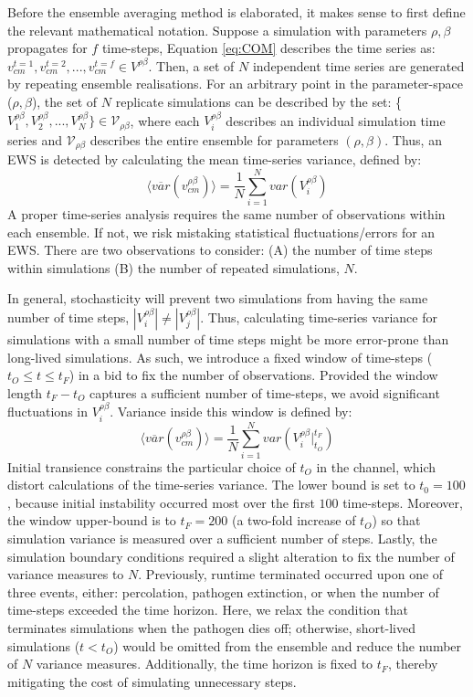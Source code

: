 Before the ensemble averaging method is elaborated, it makes sense to first define the relevant mathematical notation.
Suppose a simulation with parameters $\rho, \beta$ propagates for $f$ time-steps, Equation \ref{eq:COM} describes the time series as: $v_{cm}^{t=1}, v_{cm}^{t=2},..., v_{cm}^{t=f} \in V^{\rho\beta}$. 
Then, a set of $N$ independent time series are generated by repeating  ensemble realisations. 
For an arbitrary point in the parameter-space ($\rho, \beta$),
the set of $N$ replicate simulations can be described by the set: \{$V_1^{\rho\beta}, V_2^{\rho \beta},..., V_N^{\rho\beta}\} \in \mathcal{V}_{\rho\beta}$, 
where each $V_i^{\rho\beta}$ describes an individual simulation time series and $\mathcal{V}_{\rho\beta}$ describes the entire ensemble for parameters $(\rho, \beta)$. 
Thus, an EWS is detected by calculating the mean time-series variance,
defined by:
\begin{equation}
\label{eq:ews_eq}
    \big\langle \overline{var}(v^{\rho\beta}_{cm}) \big\rangle = \frac{1}{N}\sum\limits_{i=1}^{N} var(V_i^{\rho\beta})
\end{equation}
A proper time-series analysis requires the same number of observations within each ensemble.
If not, we risk mistaking statistical fluctuations/errors for an EWS.
There are two observations to consider: 
(A) the number of time steps within simulations 
(B) the number of repeated simulations, $N$.

In general, stochasticity will prevent two simulations from having the same number of time steps, 
$|V_i^{\rho\beta}| \neq |V_j^{\rho\beta}|$.
Thus, calculating time-series variance for simulations with a small number of time steps might be more error-prone than long-lived simulations.
As such, we introduce a fixed window of time-steps ($t_O\leq t \leq t_F$) in a bid to fix the number of observations.
Provided the window length $t_F-t_O$ captures a sufficient number of time-steps, we avoid significant fluctuations in $V_i^{\rho\beta}$. 
Variance inside this window is defined by:
\begin{equation}
\label{eq:ews_eq1}
    \big\langle \overline{var}(v^{\rho\beta}_{cm}) \big\rangle = \frac{1}{N}\sum\limits_{i=1}^{N} var(V_i^{\rho\beta}\Big|^{t_F}_{t_O})
\end{equation}
Initial transience constrains the particular choice of $t_O$ in the channel, 
which distort calculations of the time-series variance. 
The lower bound is set to $t_0=100$, because initial instability occurred most over the first $100$ time-steps. 
Moreover, the window upper-bound is to $t_F = 200$ (a two-fold increase of $t_O$) so that simulation variance is measured over a sufficient number of steps.
Lastly, the simulation boundary conditions required a slight alteration to fix the number of variance measures to $N$.
Previously, runtime terminated occurred upon one of three events, either: percolation, pathogen extinction, or when the number of time-steps exceeded the time horizon.
Here, we relax the condition that terminates simulations when the pathogen dies off;
otherwise, short-lived simulations ($t<t_O$) would be omitted from the ensemble and reduce the number of $N$ variance measures. 
Additionally, the time horizon is fixed to $t_F$, thereby mitigating the cost of simulating unnecessary steps.


